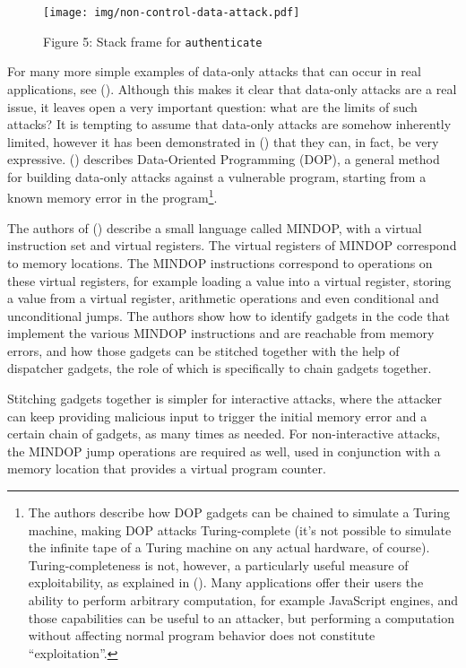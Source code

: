 \documentclass[
  a4paper,
]{report}
\begin{document}
\begin{figure}
\centering
\texttt{[image: img/non-control-data-attack.pdf]}
\caption{Figure 5: Stack frame for
\texttt{authenticate}}\label{fig:non-control-data-attack}
\end{figure}

For many more simple examples of data-only attacks that can occur in
real applications, see ().
Although this makes it clear that data-only attacks are a real issue, it
leaves open a very important question: what are the limits of such
attacks? It is tempting to assume that data-only attacks are somehow
inherently limited, however it has been demonstrated in
() that they can, in fact, be very
expressive. () describes
Data-Oriented Programming (DOP), a general method for building data-only
attacks against a vulnerable program, starting from a known memory error
in the program\footnote{The authors describe how DOP gadgets can be
  chained to simulate a Turing machine, making DOP attacks
  Turing-complete (it's not possible to simulate the infinite tape of a
  Turing machine on any actual hardware, of course). Turing-completeness
  is not, however, a particularly useful measure of exploitability, as
  explained in (). Many
  applications offer their users the ability to perform arbitrary
  computation, for example JavaScript engines, and those capabilities
  can be useful to an attacker, but performing a computation without
  affecting normal program behavior does not constitute
  ``exploitation''.}.

The authors of () describe a small
language called MINDOP, with a virtual instruction set and virtual
registers. The virtual registers of MINDOP correspond to memory
locations. The MINDOP instructions correspond to operations on these
virtual registers, for example loading a value into a virtual register,
storing a value from a virtual register, arithmetic operations and even
conditional and unconditional jumps. The authors show how to identify
gadgets in the code that implement the various MINDOP instructions and
are reachable from memory errors, and how those gadgets can be stitched
together with the help of dispatcher gadgets, the role of which is
specifically to chain gadgets together.

Stitching gadgets together is simpler for interactive attacks, where the
attacker can keep providing malicious input to trigger the initial
memory error and a certain chain of gadgets, as many times as needed.
For non-interactive attacks, the MINDOP jump operations are required as
well, used in conjunction with a memory location that provides a virtual
program counter.
\end{document}
